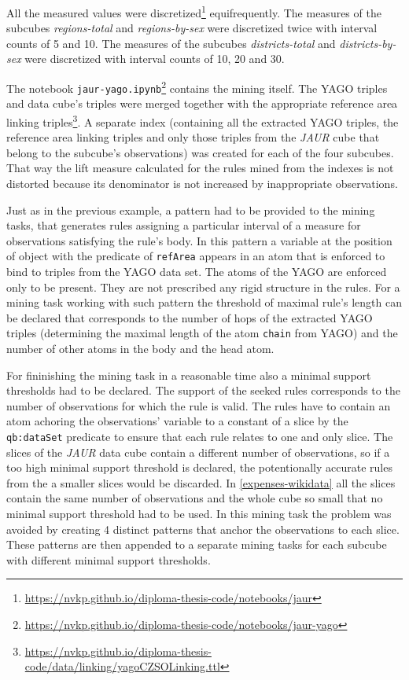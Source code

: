 All the measured values were discretized\footnote{\href{https://nvkp.github.io/diploma-thesis-code/notebooks/jaur}{https://nvkp.github.io/diploma-thesis-code/notebooks/jaur}} equifrequently. The measures of the subcubes \textit{regions-total} and \textit{regions-by-sex} were discretized twice with interval counts of 5 and 10. The measures of the subcubes \textit{districts-total} and \textit{districts-by-sex} were discretized with interval counts of 10, 20 and 30.

The notebook \verb|jaur-yago.ipynb|\footnote{\href{https://nvkp.github.io/diploma-thesis-code/notebooks/jaur-yago}{https://nvkp.github.io/diploma-thesis-code/notebooks/jaur-yago}} contains the mining itself. The YAGO triples and data cube's triples were merged together with the appropriate reference area linking triples\footnote{\href{https://nvkp.github.io/diploma-thesis-code/data/linking/yagoCZSOLinking.ttl}{https://nvkp.github.io/diploma-thesis-code/data/linking/yagoCZSOLinking.ttl}}. A separate index (containing all the extracted YAGO triples, the reference area linking triples and only those triples from the \textit{JAUR} cube that belong to the subcube's observations) was created for each of the four subcubes. That way the lift measure calculated for the rules mined from the indexes is not distorted because its denominator is not increased by inappropriate observations.

Just as in the previous example, a pattern had to be provided to the mining tasks, that generates rules assigning a particular interval of a measure for observations satisfying the rule's body. In this pattern a variable at the position of object with the predicate of \verb|refArea| appears in an atom that is enforced to bind to triples from the YAGO data set. The atoms of the YAGO are enforced only to be present. They are not prescribed any rigid structure in the rules. For a mining task working with such pattern the threshold of maximal rule's length can be declared that corresponds to the number of hops of the extracted YAGO triples (determining the maximal length of the atom \verb|chain| from YAGO) and the number of other atoms in the body and the head atom.

For fininishing the mining task in a reasonable time also a minimal support thresholds had to be declared. The support of the seeked rules corresponds to the number of observations for which the rule is valid. The rules have to contain an atom achoring the observations' variable to a constant of a slice by the \verb|qb:dataSet| predicate to ensure that each rule relates to one and only slice. The slices of the \textit{JAUR} data cube contain a different number of observations, so if a too high minimal support threshold is declared, the potentionally accurate rules from the a smaller slices would be discarded. In \ref{expenses-wikidata} all the slices contain the same number of observations and the whole cube so small that no minimal support threshold had to be used. In this mining task the problem was avoided by creating 4 distinct patterns that anchor the observations to each slice. These patterns are then appended to a separate mining tasks for each subcube with different minimal support thresholds.

